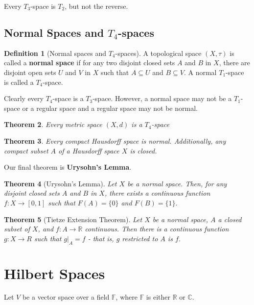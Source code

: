 \documentclass[10pt, oneside, reqno]{amsart}
\theoremstyle{plain}%
\newtheorem{thm}{Theorem}[section]
\theoremstyle{definition}
\newtheorem{defn}[thm]{Definition}
\theoremstyle{remark}
\newcommand{\R}{\mathbb{R}}
\newcommand{\Com}{\mathbb{C}}
\newcommand{\F}{\mathbb{F}}
\newcommand{\met}{(X,d)}
\newcommand{\topo}{(X,\tau)}
\begin{document}
Every $T_3$-space is $T_2$, but not the reverse.


\subsection{Normal Spaces and $T_4$-spaces} %
\label{sub:normal_spaces_and_t_4_spaces}

\begin{defn}[Normal spaces and $T_4$-spaces]
	A topological space $\topo$ is called a \textbf{normal space} if for any two disjoint closed sets $A$ and $B$ in $X$, there are disjoint open sets $U$ and $V$ in $X$ such that $A \subseteq U$ and $B \subseteq V$.  A normal $T_1$-space is called a $T_4$-space.
\end{defn}

Clearly every $T_4$-space is a $T_3$-space.  However, a normal space may not be a $T_1$-space or a regular space and a regular space may not be normal.

\begin{thm}
	Every metric space $\met$ is a $T_4$-space
\end{thm}

\begin{thm}
	Every compact Hausdorff space is normal.  Additionally, any compact subset $A$ of a Hausdorff space $X$ is closed.
\end{thm}

Our final theorem is \textbf{Urysohn's Lemma}.
\begin{thm}[Urysohn's Lemma]
	Let $X$ be a normal space.  Then, for any disjoint closed sets $A$ and $B$ in $X$, there exists a continuous function $f: X \rightarrow [0,1]$ such that $F(A) = \{0 \}$ and $F(B) = \{1 \}.$
\end{thm}

\begin{thm}[Tietze Extension Theorem]
	Let $X$ be a normal space, $A$ a closed subset of $X$, and $f : A \rightarrow \R$ continuous.  Then there is a continuous function $g: X \rightarrow R$ such that $g |_A = f$ - that is, $g$ restricted to $A$ is $f$. 
\end{thm}


\section{Hilbert Spaces} %
\label{sec:hilbert_spaces}
Let $V$ be a vector space over a field $\F$, where $\F$ is either $\R$ or $\Com$.
\end{document}
